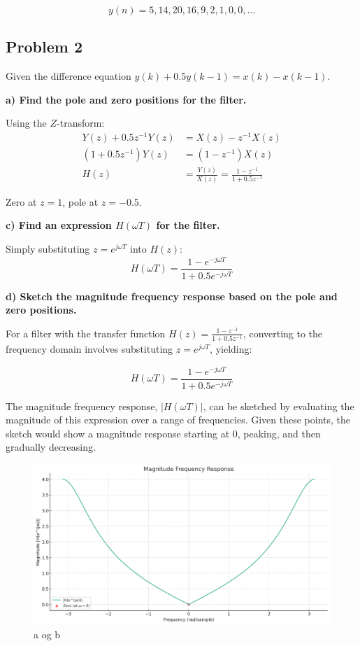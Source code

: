 \documentclass{article}
\begin{document}
\[
y(n) = 5, 14, 20, 16, 9, 2, 1, 0, 0, \dots
\]
\subsection*{Problem 2}

Given the difference equation $y(k) + 0.5y(k - 1) = x(k) - x(k - 1)$.

\textbf{a) Find the pole and zero positions for the filter.}

Using the $Z$-transform:
\begin{align*}
Y(z) + 0.5z^{-1}Y(z) &= X(z) - z^{-1}X(z) \\
\left(1 + 0.5z^{-1}\right)Y(z) &= (1 - z^{-1})X(z) \\
H(z) &= \frac{Y(z)}{X(z)} = \frac{1 - z^{-1}}{1 + 0.5z^{-1}}
\end{align*}

Zero at $z = 1$, pole at $z = -0.5$.

\textbf{c) Find an expression $H(\omega T)$ for the filter.}

Simply substituting $z = e^{j\omega T}$ into $H(z)$:
\[
H(\omega T) = \frac{1 - e^{-j\omega T}}{1 + 0.5e^{-j\omega T}}
\]

\textbf{d) Sketch the magnitude frequency response based on the pole and zero positions.}

For a filter with the transfer function \(H(z) = \frac{1 - z^{-1}}{1 + 0.5z^{-1}}\), converting to the frequency domain involves substituting \(z = e^{j\omega T}\), yielding:

\[
H(\omega T) = \frac{1 - e^{-j\omega T}}{1 + 0.5e^{-j\omega T}}
\]

The magnitude frequency response, \(|H(\omega T)|\), can be sketched by evaluating the magnitude of this expression over a range of frequencies.
Given these points, the sketch would show a magnitude response starting at 0, peaking, and then gradually decreasing.
\begin{figure}[H]
    \centering
    \includegraphics[width=1\textwidth]{image1.png}
    \caption{a og b}
    \label{fig:example}
\end{figure}
\end{document}
